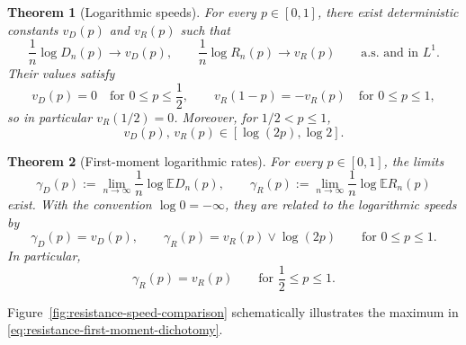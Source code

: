 \documentclass[12pt]{amsart}
\numberwithin{equation}{section}
\theoremstyle{plain}
\newtheorem{theorem}{Theorem}[section]
\theoremstyle{definition}
\newcommand{\E}{\mathbb E}
\begin{document}
\begin{theorem}[Logarithmic speeds]
\label{thm:logarithmic-speeds}
For every $p\in[0,1]$, there exist deterministic constants $v_D(p)$ and
$v_R(p)$ such that
\begin{equation}
 \frac1n\log D_n(p)\longrightarrow v_D(p),
 \qquad
 \frac1n\log R_n(p)\longrightarrow v_R(p)
 \qquad\text{a.s. and in }L^1.
 \label{eq:full-range-L1}
\end{equation}
Their values satisfy
\begin{equation*}
 v_D(p)=0\quad\text{for }0\le p\le\frac12,
 \qquad
 v_R(1-p)=-v_R(p)\quad\text{for }0\le p\le1,
\end{equation*}
so in particular $v_R(1/2)=0$.  Moreover, for $1/2<p\le1$,
\begin{equation}
 v_D(p),\,v_R(p)\in[\log(2p),\log2].
 \label{eq:supercritical-speed-bounds}
\end{equation}
\end{theorem}

\begin{theorem}[First-moment logarithmic rates]
\label{thm:first-moment-logarithmic-rates}
For every $p\in[0,1]$, the limits
\begin{equation*}
 \gamma_D(p):=\lim_{n\to\infty}\frac1n\log\E D_n(p),
 \qquad
 \gamma_R(p):=\lim_{n\to\infty}\frac1n\log\E R_n(p)
\end{equation*}
exist.  With the convention $\log0=-\infty$, they are related to the
logarithmic speeds by
\begin{equation}\label{eq:resistance-first-moment-dichotomy}
 \gamma_D(p)=v_D(p),
 \qquad
 \gamma_R(p)=v_R(p)\vee\log(2p)
 \qquad\text{for }0\le p\le1.
\end{equation}
In particular,
\begin{equation}
 \gamma_R(p)=v_R(p)\qquad\text{for }\frac12\le p\le1.
 \label{eq:supercritical-resistance-identification}
\end{equation}
\end{theorem}

Figure~\ref{fig:resistance-speed-comparison} schematically illustrates
the maximum in \eqref{eq:resistance-first-moment-dichotomy}.
\end{document}

